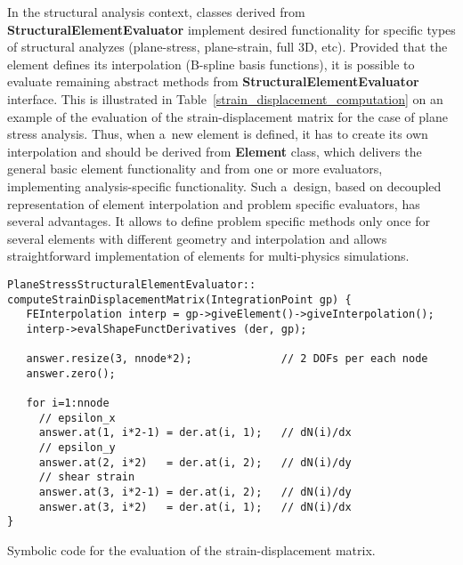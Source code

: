 \documentclass[a4paper]{article}
\newcommand{\class}[1]{{\bf #1}}
\begin{document}
In the structural analysis context, classes derived from
\class{StructuralElementEvaluator} implement desired functionality for
specific types of structural analyzes (plane-stress, plane-strain,
full 3D, etc). Provided that the element defines its interpolation
(B-spline basis functions), it is
possible to evaluate remaining abstract methods from
\class{StructuralElementEvaluator} interface. This is illustrated in
Table~\ref{strain_displacement_computation} on an example of the
evaluation of the strain-displacement matrix for the case of plane
stress analysis. Thus, when a~new element is 
defined, it has to create its own interpolation and should be derived from
\class{Element} class, which delivers the general basic element
functionality and from one or more evaluators, implementing
analysis-specific functionality. Such a~design, based on 
decoupled representation of element interpolation and problem specific
evaluators, has several advantages. It allows to define problem
specific methods only once for several elements with different geometry and
interpolation and allows straightforward implementation of elements
for multi-physics simulations. 

\begin{table}[t]
\footnotesize
\begin{verbatim}
PlaneStressStructuralElementEvaluator::
computeStrainDisplacementMatrix(IntegrationPoint gp) {
   FEInterpolation interp = gp->giveElement()->giveInterpolation();
   interp->evalShapeFunctDerivatives (der, gp);
 
   answer.resize(3, nnode*2);              // 2 DOFs per each node
   answer.zero();
  
   for i=1:nnode
     // epsilon_x
     answer.at(1, i*2-1) = der.at(i, 1);   // dN(i)/dx
     // epsilon_y
     answer.at(2, i*2)   = der.at(i, 2);   // dN(i)/dy
     // shear strain
     answer.at(3, i*2-1) = der.at(i, 2);   // dN(i)/dy
     answer.at(3, i*2)   = der.at(i, 1);   // dN(i)/dx
}
\end{verbatim}
\caption{Symbolic code for the evaluation of the strain-displacement matrix.}
\label{strain_displacement_computation}
\end{table}
\end{document}
